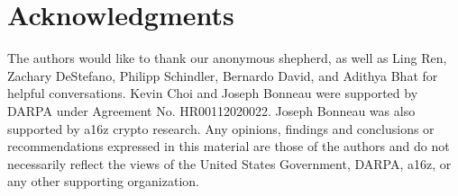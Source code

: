 \section*{Acknowledgments}

The authors would like to thank our anonymous shepherd, as well as Ling Ren, Zachary DeStefano, Philipp Schindler, Bernardo David, and Adithya Bhat for helpful conversations.
Kevin Choi and Joseph Bonneau were supported by DARPA under Agreement No. HR00112020022.
Joseph Bonneau was also supported by a16z crypto research.
Any opinions, findings and conclusions or recommendations expressed in this material are those of the authors and do not necessarily reflect the views of the United States Government, DARPA, a16z, or any other supporting organization.
